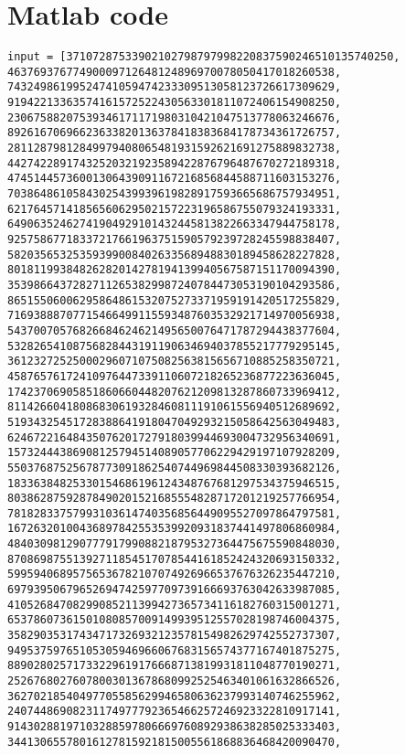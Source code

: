 \documentclass{article}
\begin{document}
\section*{Matlab code}
\begin{verbatim}
input = [37107287533902102798797998220837590246510135740250,
46376937677490009712648124896970078050417018260538,
74324986199524741059474233309513058123726617309629,
91942213363574161572522430563301811072406154908250,
23067588207539346171171980310421047513778063246676,
89261670696623633820136378418383684178734361726757,
28112879812849979408065481931592621691275889832738,
44274228917432520321923589422876796487670272189318,
47451445736001306439091167216856844588711603153276,
70386486105843025439939619828917593665686757934951,
62176457141856560629502157223196586755079324193331,
64906352462741904929101432445813822663347944758178,
92575867718337217661963751590579239728245598838407,
58203565325359399008402633568948830189458628227828,
80181199384826282014278194139940567587151170094390,
35398664372827112653829987240784473053190104293586,
86515506006295864861532075273371959191420517255829,
71693888707715466499115593487603532921714970056938,
54370070576826684624621495650076471787294438377604,
53282654108756828443191190634694037855217779295145,
36123272525000296071075082563815656710885258350721,
45876576172410976447339110607218265236877223636045,
17423706905851860660448207621209813287860733969412,
81142660418086830619328460811191061556940512689692,
51934325451728388641918047049293215058642563049483,
62467221648435076201727918039944693004732956340691,
15732444386908125794514089057706229429197107928209,
55037687525678773091862540744969844508330393682126,
18336384825330154686196124348767681297534375946515,
80386287592878490201521685554828717201219257766954,
78182833757993103614740356856449095527097864797581,
16726320100436897842553539920931837441497806860984,
48403098129077791799088218795327364475675590848030,
87086987551392711854517078544161852424320693150332,
59959406895756536782107074926966537676326235447210,
69793950679652694742597709739166693763042633987085,
41052684708299085211399427365734116182760315001271,
65378607361501080857009149939512557028198746004375,
35829035317434717326932123578154982629742552737307,
94953759765105305946966067683156574377167401875275,
88902802571733229619176668713819931811048770190271,
25267680276078003013678680992525463401061632866526,
36270218540497705585629946580636237993140746255962,
24074486908231174977792365466257246923322810917141,
91430288197103288597806669760892938638285025333403,
34413065578016127815921815005561868836468420090470,

\end{verbatim}
\end{document}
